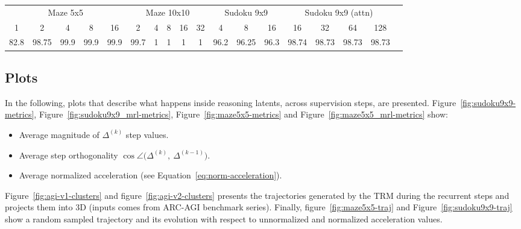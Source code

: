 \documentclass{article}
\begin{document}
\begin{center}
\footnotesize
\setlength{\tabcolsep}{5pt}
\label{tab:token-accuracy}
\begin{tabular}{ccccc ccccc cccc cccc}
\toprule
\multicolumn{5}{c}{Maze 5x5} &
\multicolumn{5}{c}{Maze 10x10} &
\multicolumn{3}{c}{Sudoku 9x9} &
\multicolumn{4}{c}{Sudoku 9x9 (attn)} \\

\cmidrule(lr){1-5}
\cmidrule(lr){6-10}
\cmidrule(lr){11-13}
\cmidrule(lr){14-17}

1 & 2 & 4 & 8 & 16 &
2 & 4 & 8 & 16 & 32 &
4 & 8 & 16 &
16 & 32 & 64 & 128 \\

\midrule

82.8 & 98.75 & 99.9 & 99.9 & 99.9 &
99.7 & 1 & 1 & 1 & 1 &
96.2 & 96.25 & 96.3 &
98.74 & 98.73 & 98.73     & 98.73 \\

\bottomrule
\end{tabular}
\end{center}


\subsection*{Plots}

In the following, plots that describe what happens inside reasoning latents, across supervision steps, are presented.
Figure~\ref{fig:sudoku9x9-metrics}, Figure~\ref{fig:sudoku9x9_mrl-metrics}, Figure~\ref{fig:maze5x5-metrics} and Figure~\ref{fig:maze5x5_mrl-metrics} show:
\begin{itemize}
    \item Average magnitude of $\Delta^{(k)}$ step values.
    \item Average step orthogonality $\cos \angle\!\bigl(\Delta^{(k)},\ \Delta^{(k-1)}\bigr)$.
    \item Average normalized acceleration (see Equation~\ref{eq:norm-acceleration}).
\end{itemize}
Figure~\ref{fig:agi-v1-clusters} and figure~\ref{fig:agi-v2-clusters} presents the trajectories generated by the TRM during the recurrent steps and projects them into 3D (inputs comes from ARC-AGI benchmark series).
Finally, figure~\ref{fig:maze5x5-traj} and Figure~\ref{fig:sudoku9x9-traj} show a random sampled trajectory and its evolution with respect to unnormalized and normalized acceleration values.
\end{document}
